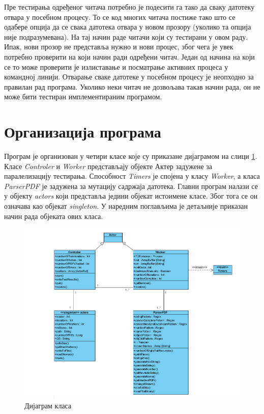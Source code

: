 \documentclass[12pt,oneside]{memoir}
\begin{document}
Пре тестирања одређеног читача потребно је подесити га тако да сваку датотеку отвара у посебном процесу. То се код многих читача постиже тако што се одабере опција да се свака датотека отвара у новом прозору  (уколико та опција није подразумевана). На тај начин раде читачи који су тестирани у овом раду. Ипак, нови прозор не представља нужно и нови процес, због чега је увек потребно проверити на који начин ради одређени читач. Један од начина на који се то може проверити је излиставање и посматрање активних процеса у командној линији. Отварање сваке датотеке у посебном процесу је неопходно за правилан рад програма. Уколико неки читач не дозвољава такав начин рада, он не може бити тестиран имплементираним програмом. 

\section{Организација програма}
\label{sec:orgProg}

Програм је организован у четири класе које су приказане дијаграмом на слици \ref{fig:classDiagram}. Класе \textit{Controler} и \textit{Worker} представљају објекте Актер задужене за паралелизацију тестирања. Способност \textit{Timers} је спојена у класу \textit{Worker}, а класа \textit{ParserPDF} је задужена за мутацију садржаја датотека. Главни програм налази се у објекту \textit{actors} који представља једини објекат истоимене класе. Због тога се он означава као објекат \textit{singleton}. У наредним поглављима је детаљније приказан начин рада објеката ових класа. 

\begin{figure}[!ht]
  \centering
  \includegraphics[width=1\textwidth]{classDiagram.png}
  \caption{Дијаграм класа}
  \label{fig:classDiagram}
\end{figure}
\end{document}
